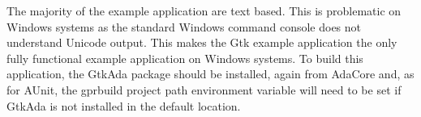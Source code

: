 The majority of the example application are text based. This is
problematic on Windows systems as the standard Windows command console
does not understand Unicode output. This makes the Gtk example application
the only fully functional example application on Windows systems. To
build this application, the GtkAda package should be installed, again from
AdaCore and, as for AUnit, the gprbuild project path environment variable
will need to be set if GtkAda is not installed in the default location.
